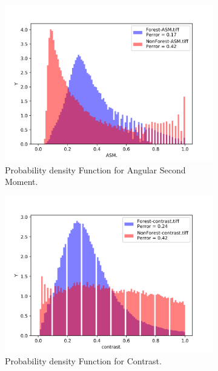 \begin{figure}[H]
  \centering
  \begin{subfigure}[b]{0.4\linewidth}
    \includegraphics[width=\linewidth]{Chapter4/glcm_textures/ASM_hist.png}
     \caption{Probability density Function for Angular Second Moment.}
  \end{subfigure}
  \centering
  \begin{subfigure}[b]{0.4\linewidth}
    \includegraphics[width=\linewidth]{Chapter4/glcm_textures/contrast_hist.png}
     \caption{Probability density Function for Contrast.}
  \end{subfigure}
  \centering
  \begin{subfigure}[b]{0.4\linewidth}

\end{subfigure}
\end{figure}
